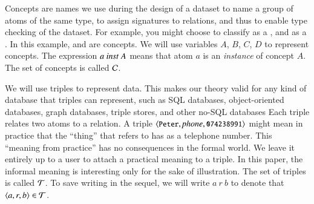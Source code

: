 \documentclass{elsarticle}
\begin{document}
   Concepts are names we use during the design of a dataset
   to name a group of atoms of the same type,
   to assign signatures to relations, and thus
   to enable type checking of the dataset.
   For example, you might choose to classify  as a , and  as a .
   In this example,  and  are concepts.
   We will use variables $A$, $B$, $C$, $D$ to represent concepts.
   The expression $a\ \inst\ A$ means that atom $a$ is an \emph{instance} of concept $A$.
   The set of concepts is called $\mathcal{C}$.
   
   We will use triples to represent data.
   This makes our theory valid for any kind of database that triples can represent,
   such as SQL databases, object-oriented databases, graph databases, triple stores, and other no-SQL databases
   Each triple relates two atoms to a relation.
   A triple $\langle{\text{{\tt\small Peter}}},{\text{\it phone\/}},{\text{{\tt\small 074238991}}}\rangle$ might mean in practice that
   the ``thing'' that  refers to has  as a telephone number.
   This ``meaning from practice'' has no consequences in the formal world.
   We leave it entirely up to a user to attach a practical meaning to a triple.
   In this paper, the informal meaning is interesting only for the sake of illustration.
   The set of triples is called $\mathcal{T}$.
   To save writing in the sequel, we will write $a\ r\ b$ to denote that $\langle{a},{r},{b}\rangle\in\mathcal{T}$.
\end{document}
